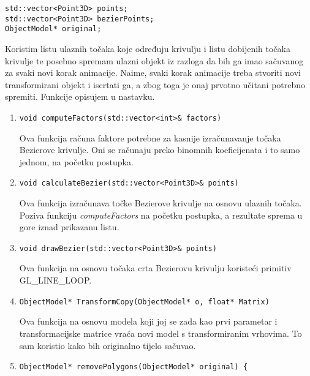 \documentclass[utf8]{fer}
\begin{document}
\begin{lstlisting}
std::vector<Point3D> points;
std::vector<Point3D> bezierPoints;
ObjectModel* original;
\end{lstlisting}

Koristim listu ulaznih točaka koje određuju krivulju i listu dobijenih točaka krivulje te posebno spremam ulazni objekt iz razloga da bih ga imao sačuvanog za svaki novi korak animacije. Naime, svaki korak animacije treba stvoriti novi transformirani objekt i iscrtati ga, a zbog toga je onaj prvotno učitani potrebno spremiti. Funkcije opisujem u nastavku.

\begin{enumerate}
\item \begin{lstlisting}
void computeFactors(std::vector<int>& factors)
\end{lstlisting}

Ova funkcija računa faktore potrebne za kasnije izračunavanje točaka Bezierove krivulje. Oni se računaju preko binomnih koeficijenata i to samo jednom, na početku postupka.

\item \begin{lstlisting}
void calculateBezier(std::vector<Point3D>& points)
\end{lstlisting}

Ova funkcija izračunava točke Bezierove krivulje na osnovu ulaznih točaka. Poziva funkciju \textit{computeFactors} na početku postupka, a rezultate sprema u gore iznad prikazanu listu.  


\item \begin{lstlisting}
void drawBezier(std::vector<Point3D>& points)
\end{lstlisting}
Ova funkcija na osnovu točaka crta Bezierovu krivulju koristeći primitiv GL\_LINE\_LOOP.


\item \begin{lstlisting}
ObjectModel* TransformCopy(ObjectModel* o, float* Matrix)
\end{lstlisting}

Ova funkcija na osnovu modela koji joj se zada kao prvi parametar i transformacijske matrice vraća novi model s transformiranim vrhovima. To sam koristio kako bih originalno tijelo sačuvao.
\newline
\newline

\item \begin{lstlisting}
ObjectModel* removePolygons(ObjectModel* original) {
\end{lstlisting}


\end{enumerate}
\end{document}
